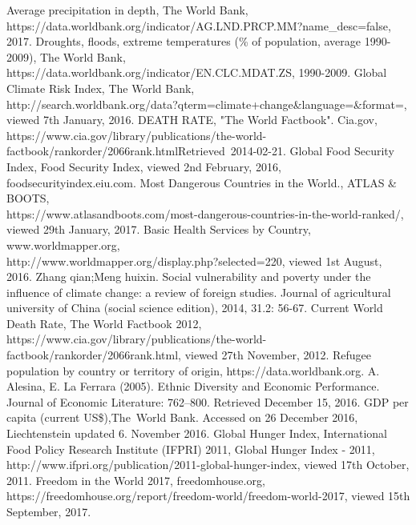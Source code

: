 \documentclass{mcmthesis}
\begin{document}
\newpage
\begin{thebibliography}{99}
 Average precipitation in depth, The World Bank, \\ https://data.worldbank.org/indicator/AG.LND.PRCP.MM?name\_desc=false, 2017.
 Droughts, floods, extreme temperatures (\% of population, average 1990-2009), The World Bank, https://data.worldbank.org/indicator/EN.CLC.MDAT.ZS, 1990-2009.
 Global Climate Risk Index, The World Bank,\\http://search.worldbank.org/data?qterm=climate+change\&language=\&format=, viewed 7th January, 2016.
 DEATH RATE, "The World Factbook". Cia.gov, \\https://www.cia.gov/library/publications/the-world-factbook/rankorder/2066rank.htmlRetrieved 2014-02-21.
 Global Food Security Index, Food Security Index, viewed 2nd February, 2016, foodsecurityindex.eiu.com.
 Most Dangerous Countries in the World., ATLAS \& BOOTS,\\ https://www.atlasandboots.com/most-dangerous-countries-in-the-world-ranked/, viewed 29th January, 2017.
 Basic Health Services by Country, www.worldmapper.org, \\http://www.worldmapper.org/display.php?selected=220, viewed 1st August, 2016.
 Zhang qian;Meng huixin. Social vulnerability and poverty under the influence of climate change: a review of foreign studies. Journal of agricultural university of China (social science edition), 2014, 31.2: 56-67.
 Current World Death Rate, The World Factbook 2012,\\ https://www.cia.gov/library/publications/the-world-factbook/rankorder/2066rank.html, viewed 27th November, 2012.
 Refugee population by country or territory of origin, https://data.worldbank.org.
 A. Alesina, E. La Ferrara (2005). Ethnic Diversity and Economic Performance. Journal of Economic Literature: 762–800. Retrieved December 15, 2016.
 GDP per capita (current US\$),The World Bank. Accessed on 26 December 2016, Liechtenstein updated 6. November 2016.
 Global Hunger Index, International Food Policy Research Institute (IFPRI) 2011, Global Hunger Index - 2011, \\http://www.ifpri.org/publication/2011-global-hunger-index, viewed 17th October, 2011.
 Freedom in the World 2017, freedomhouse.org,\\ https://freedomhouse.org/report/freedom-world/freedom-world-2017, viewed 15th September, 2017.

\end{thebibliography}
\end{document}
